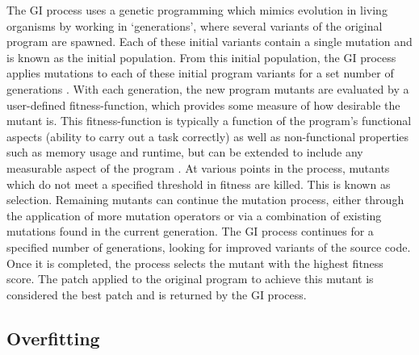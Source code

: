 \documentclass[titlepage]{article}
\begin{document}
The GI process uses a genetic programming which mimics evolution in living organisms by working in ‘generations’, where several variants of the original program are spawned. Each of these initial variants contain a single mutation and is known as the initial population. From this initial population, the GI process applies mutations to each of these initial program variants for a set number of generations  \cite{petkespecialise}. With each generation, the new program mutants are evaluated by a user-defined fitness-function, which provides some measure of how desirable the mutant is. This fitness-function is typically a function of the program's functional aspects (ability to carry out a task correctly) as well as non-functional properties such as memory usage and runtime, but can be extended to include any measurable aspect of the program \cite{fitnessfunction}. At various points in the process, mutants which do not meet a specified threshold in fitness are killed. This is known as selection. Remaining mutants can continue the mutation process, either through the application of more mutation operators or via a combination of existing mutations found in the current generation. 
The GI process continues for a specified number of generations, looking for improved variants of the source code. Once it is completed, the process selects the mutant with the highest fitness score. The patch applied to the original program to achieve this mutant is considered the best patch and is returned by the GI process.

\subsection{Overfitting}
\end{document}

